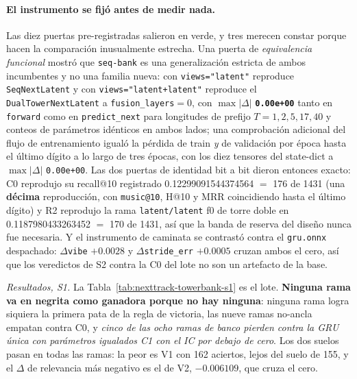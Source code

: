 \documentclass[11pt]{article}
\begin{document}
\paragraph{El instrumento se fijó antes de medir nada.} Las diez puertas
pre-registradas salieron en verde, y tres merecen constar porque hacen la
comparación inusualmente estrecha. Una puerta de \emph{equivalencia funcional}
mostró que \texttt{seq-bank} es una generalización estricta de ambos incumbentes
y no una familia nueva: con \texttt{views="latent"} reproduce
\texttt{SeqNextLatent} y con \texttt{views="latent+latent"} reproduce el
\texttt{DualTowerNextLatent} a \texttt{fusion\_layers}${}=0$, con
$\max|\Delta|$ \textbf{\texttt{0.00e+00}} tanto en \texttt{forward} como en
\texttt{predict\_next} para longitudes de prefijo $T=1,2,5,17,40$ y conteos de
parámetros idénticos en ambos lados; una comprobación adicional del flujo de
entrenamiento igualó la pérdida de train \emph{y} de validación por época hasta el
último dígito a lo largo de tres épocas, con los diez tensores del state-dict a
$\max|\Delta|$ \texttt{0.00e+00}. Las dos puertas de identidad bit a bit dieron
entonces exacto: C0 reprodujo su recall@10 registrado
\num{0.12299091544374564} $=$ \num{176} de \num{1431} (una \textbf{décima}
reproducción, con \texttt{music@10}, H@10 y MRR coincidiendo hasta el último
dígito) y R2 reprodujo la rama \texttt{latent/latent} f0 de torre doble en
\num{0.1187980433263452} $=$ \num{170} de \num{1431}, así que la banda de reserva
del diseño nunca fue necesaria. Y el instrumento de caminata se contrastó contra
el \texttt{gru.onnx} despachado: $\Delta$\texttt{vibe} $+\num{0.0028}$ y
$\Delta$\texttt{stride\_err} $+\num{0.0005}$ cruzan ambos el cero, así que los
veredictos de S2 contra la C0 del lote no son un artefacto de la base.

\emph{Resultados, S1.} La Tabla~\ref{tab:nexttrack-towerbank-s1} es el lote. \textbf{Ninguna
rama va en negrita como ganadora porque no hay ninguna}: ninguna rama logra
siquiera la primera pata de la regla de victoria, las nueve ramas no-ancla empatan
contra C0, y \emph{cinco de las ocho ramas de banco pierden contra la GRU única
con parámetros igualados C1 con el IC por debajo de cero}. Los dos suelos pasan en
todas las ramas: la peor es V1 con \num{162} aciertos, lejos del suelo de
\num{155}, y el $\Delta$ de relevancia más negativo es el de V2,
$-\num{0.006109}$, que cruza el cero.
\end{document}

